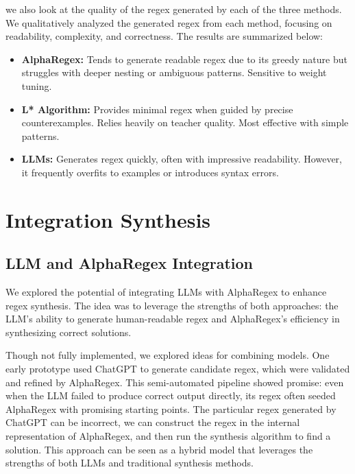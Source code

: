 \indent\indent we also look at the quality of the regex generated by each of the three methods. We qualitatively analyzed the generated regex from each method, focusing on readability, complexity, and correctness. The results are summarized below:

\begin{itemize}
\item \textbf{AlphaRegex:} Tends to generate readable regex due to its greedy nature but struggles with deeper nesting or ambiguous patterns. Sensitive to weight tuning.
\item \textbf{L* Algorithm:} Provides minimal regex when guided by precise counterexamples. Relies heavily on teacher quality. Most effective with simple patterns.
\item \textbf{LLMs:} Generates regex quickly, often with impressive readability. However, it frequently overfits to examples or introduces syntax errors.
\end{itemize}

\section{Integration Synthesis}

\subsection{LLM and AlphaRegex Integration}
\indent\indent We explored the potential of integrating LLMs with AlphaRegex to enhance regex synthesis. The idea was to leverage the strengths of both approaches: the LLM's ability to generate human-readable regex and AlphaRegex's efficiency in synthesizing correct solutions.

\indent\indent Though not fully implemented, we explored ideas for combining models. One early prototype used ChatGPT to generate candidate regex, which were validated and refined by AlphaRegex. This semi-automated pipeline showed promise: even when the LLM failed to produce correct output directly, its regex often seeded AlphaRegex with promising starting points. The particular regex generated by ChatGPT can be incorrect, we can construct the regex in the internal representation of AlphaRegex, and then run the synthesis algorithm to find a solution. This approach can be seen as a hybrid model that leverages the strengths of both LLMs and traditional synthesis methods. 

